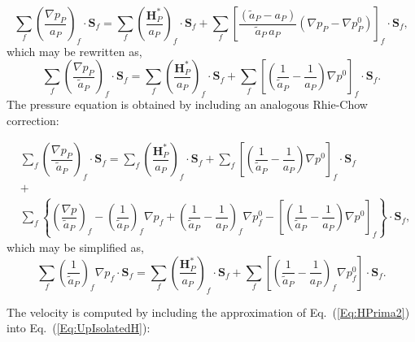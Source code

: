 \documentclass[final,3p,times,11pt,onecolumn]{myElsarticle}
\numberwithin{equation}{section}
\begin{document}
\begin{equation}
\label{Eq:pressureReplacedSimplec}
\sum_{f} 
\left(
\dfrac
{
\nabla p_P}
{a_P}
\right)_f
\cdotp 
\boldsymbol{S}_{f}
=
\sum_{f} 
\left(
\dfrac
{
\boldsymbol{H}_P^{*}
}
{a_P}
\right)_f
\cdotp 
\boldsymbol{S}_{f}
+
\sum_f
\left[
\dfrac
{
\left(
\tilde{a}_P
-
a_P
\right)
}
{
\tilde{a}_P\,a_P
}
\left(
\nabla p_P
-
\nabla p_P^{0}
\right)
\right]_f
\cdot
\boldsymbol{S}_{f},
\end{equation}
which may be rewritten as,
\begin{equation}
\label{Eq:pressureReplacedSimplec2}
\sum_{f} 
\left(
\dfrac
{
\nabla p_P}
{\tilde{a}_P}
\right)_f
\cdotp 
\boldsymbol{S}_{f}
=
\sum_{f} 
\left(
\dfrac
{
\boldsymbol{H}_P^{*}
}
{a_P}
\right)_f
\cdotp 
\boldsymbol{S}_{f}
+
\sum_f
\left[
\left(
\dfrac{1}
{\tilde{a}_P}
-
\dfrac{1}
{a_P}
\right)
\nabla p^{0}
\right]_f
\cdot
\boldsymbol{S}_f.
\end{equation}
The pressure equation is obtained by including an analogous Rhie-Chow correction:

\begin{equation}
\label{eq:pEqnSIMPLEC2}
\begin{array}{ccc}
&
\sum_{f} 
\left(
\dfrac
{
\nabla p_P}
{\tilde{a}_P}
\right)_f
\cdotp 
\boldsymbol{S}_{f} 
=
\sum_{f} 
\left(
\dfrac
{
\boldsymbol{H}_P^{*}
}
{a_P}
\right)_f
\cdotp 
\boldsymbol{S}_{f}
+
\sum_f
\left[
\left(
\dfrac{1}
{\tilde{a}_P}
-
\dfrac{1}
{a_P}
\right)
\nabla p^{0}
\right]_f
\cdot
\boldsymbol{S}_f
&
\\
&+& \\
&
\sum_f
\left\lbrace
\left(
\dfrac
{
\nabla p
}
{\tilde{a}_P}
\right)_f
-
\left(
\dfrac
{1}
{\tilde{a}_P}
\right)_f
\nabla p_f
+
\left(
\dfrac
{1}
{\tilde{a}_P}
-
\dfrac
{1}
{a_P}
\right)_f
\nabla p^{0}_f
-
\left[
\left(
\dfrac
{1}
{\tilde{a}_P}
-
\dfrac
{1}
{a_P}
\right)
\nabla p^0
\right]_f
\right\rbrace
\cdot
\boldsymbol{S}_f,
&
\end{array}
\end{equation}
which may be simplified as,
\begin{equation}
\sum_f
\left(
\dfrac
{1}
{\tilde{a}_P}
\right)_f
\nabla p_f
\cdot 
\boldsymbol{S}_f
= 
\sum_f 
\left(
\frac{
\boldsymbol{H}_P^*
}{a_P}
\right)_f 
\cdot
\boldsymbol{S}_f
+
\sum_f
\left[
\left(
\dfrac
{1}
{\tilde{a}_P}
-
\dfrac
{1}
{a_P}
\right)_f
\nabla p^{0}_f
\right]
\cdot
\boldsymbol{S}_f.
\label{eq:pEqnSIMPLEC}
\end{equation}

The velocity is computed by including the approximation of Eq.~(\ref{Eq:HPrima2}) into Eq.~(\ref{Eq:UpIsolatedH}):
\end{document}
